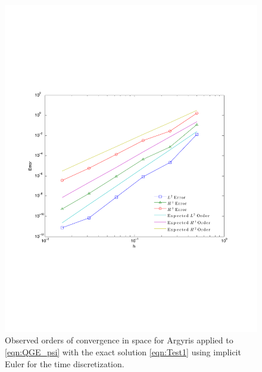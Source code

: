 \begin{figure}
  \begin{center}
    \includegraphics[scale=0.6]{sin2sin2sinSpaceConvergence.pdf}
    \caption{Observed orders of convergence in space for Argyris applied to
      \eqref{eqn:QGE_psi} with the exact solution \eqref{eqn:Test1} using
      implicit Euler for the time discretization.}
  \label{fig:Test1Space}
  \end{center}
\end{figure}

